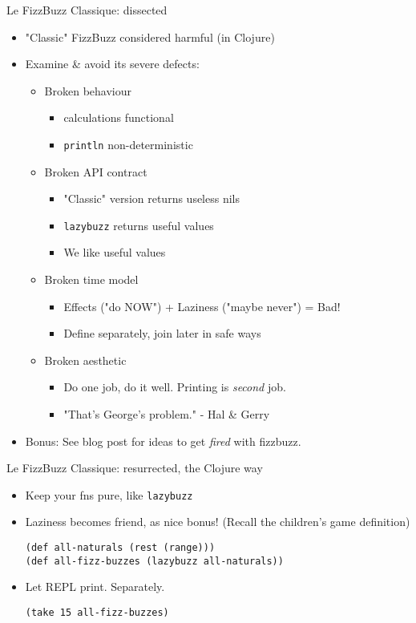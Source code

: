 \documentclass[presentation]{beamer}
\begin{document}
\begin{frame}[label={sec:orgb707d02},fragile]{Le FizzBuzz Classique: dissected}
 \begin{itemize}
\item "Classic" FizzBuzz considered harmful (in Clojure)

\item Examine \& avoid its severe defects:
\begin{itemize}
\item \alert{Broken behaviour}
\begin{itemize}
\item calculations functional
\item \texttt{println} non-deterministic
\end{itemize}

\item \alert{Broken API contract}
\begin{itemize}
\item "Classic" version returns useless nils
\item \texttt{lazybuzz} returns useful values
\item We like useful values
\end{itemize}

\item \alert{Broken time model}
\begin{itemize}
\item Effects ("do NOW") + Laziness ("maybe never") = Bad!
\item Define separately, join later in safe ways
\end{itemize}

\item \alert{Broken aesthetic}
\begin{itemize}
\item Do one job, do it well. Printing is \emph{second} job.
\item "That's George's problem." - Hal \& Gerry
\end{itemize}
\end{itemize}

\item Bonus: See blog post for ideas to get \emph{fired} with fizzbuzz.
\end{itemize}
\end{frame}
\begin{frame}[label={sec:orgf26ca7d},fragile]{Le FizzBuzz Classique: resurrected, the Clojure way}
 \begin{itemize}
\item Keep your fns pure, like \texttt{lazybuzz}

\item Laziness becomes friend, as nice bonus!
(Recall the children's game definition)
\begin{verbatim}
(def all-naturals (rest (range)))
(def all-fizz-buzzes (lazybuzz all-naturals))
\end{verbatim}

\item Let REPL print. Separately.
\begin{verbatim}
(take 15 all-fizz-buzzes)
\end{verbatim}
\end{itemize}
\end{frame}
\end{document}
